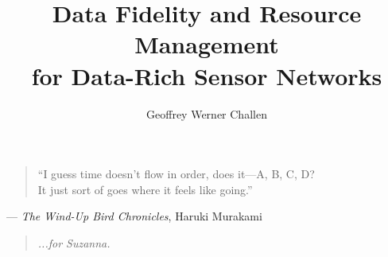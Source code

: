 
\title{Data Fidelity and Resource Management\\for Data-Rich Sensor Networks}
\author{Geoffrey Werner Challen}

\maketitle
\copyrightpage



\begin{abstract}

\end{abstract}


{\ssp
\epigram
\vspace*{50pt}
\begin{quote} 
``I guess time doesn't flow in order, does it---A, B, C, D?\\It just sort of
goes where it feels like going.''
\end{quote}
\hfill--- \textit{The Wind-Up Bird Chronicles}, Haruki Murakami}
\newpage


{\ssp
{}
\tableofcontents
\newpage
\listoffigures
\listoftables}



\begin{acknowledgments}

\end{acknowledgments}


{\ssp
\dedication
\vspace*{50pt}
\begin{quote}
\hfill \textit{...for Suzanna.}
\end{quote}}
\newpage


\startarabicpagination


